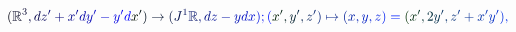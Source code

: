 \documentclass[12pt]{article}
\begin{document}
\makeatletter
\renewcommand*{\@textcolor}[3]{%
  \protect\leavevmode
  \begingroup
    \color#1{#2}#3%
  \endgroup
}
\makeatother
\begin{displaymath}
\mathcolor[RGB]{0,0,15}{(} \mathbb { \mathcolor[RGB]{0,0,30}{R} } ^ { \mathcolor[RGB]{0,0,45}{3} } \mathcolor[RGB]{0,0,60}{,} \mathcolor[RGB]{0,0,75}{d} \mathcolor[RGB]{0,0,90}{z} ^ { \mathcolor[RGB]{0,0,105}{\prime} } \mathcolor[RGB]{0,0,120}{+} \mathcolor[RGB]{0,0,135}{x} ^ { \mathcolor[RGB]{0,0,150}{\prime} } \mathcolor[RGB]{0,0,165}{d} \mathcolor[RGB]{0,0,180}{y} ^ { \mathcolor[RGB]{0,0,195}{\prime} } \mathcolor[RGB]{0,0,210}{-} \mathcolor[RGB]{0,0,225}{y} ^ { \mathcolor[RGB]{0,0,240}{\prime} } \mathcolor[RGB]{0,0,255}{d} \mathcolor[RGB]{0,15,0}{x} ^ { \mathcolor[RGB]{0,15,15}{\prime} } \mathcolor[RGB]{0,15,30}{)} \mathcolor[RGB]{0,15,45}{\to} \mathcolor[RGB]{0,15,60}{(} \mathcolor[RGB]{0,15,75}{J} ^ { \mathcolor[RGB]{0,15,90}{1} } \mathbb { \mathcolor[RGB]{0,15,105}{R} } \mathcolor[RGB]{0,15,120}{,} \mathcolor[RGB]{0,15,135}{d} \mathcolor[RGB]{0,15,150}{z} \mathcolor[RGB]{0,15,165}{-} \mathcolor[RGB]{0,15,180}{y} \mathcolor[RGB]{0,15,195}{d} \mathcolor[RGB]{0,15,210}{x} \mathcolor[RGB]{0,15,225}{)} \mathcolor[RGB]{0,15,240}{;} \mathcolor[RGB]{0,15,255}{(} \mathcolor[RGB]{0,30,0}{x} ^ { \mathcolor[RGB]{0,30,15}{\prime} } \mathcolor[RGB]{0,30,30}{,} \mathcolor[RGB]{0,30,45}{y} ^ { \mathcolor[RGB]{0,30,60}{\prime} } \mathcolor[RGB]{0,30,75}{,} \mathcolor[RGB]{0,30,90}{z} ^ { \mathcolor[RGB]{0,30,105}{\prime} } \mathcolor[RGB]{0,30,120}{)} \mathcolor[RGB]{0,30,135}{\mapsto} \mathcolor[RGB]{0,30,150}{(} \mathcolor[RGB]{0,30,165}{x} \mathcolor[RGB]{0,30,180}{,} \mathcolor[RGB]{0,30,195}{y} \mathcolor[RGB]{0,30,210}{,} \mathcolor[RGB]{0,30,225}{z} \mathcolor[RGB]{0,30,240}{)} \mathcolor[RGB]{0,30,255}{=} \mathcolor[RGB]{0,45,0}{(} \mathcolor[RGB]{0,45,15}{x} ^ { \mathcolor[RGB]{0,45,30}{\prime} } \mathcolor[RGB]{0,45,45}{,} \mathcolor[RGB]{0,45,60}{2} \mathcolor[RGB]{0,45,75}{y} ^ { \mathcolor[RGB]{0,45,90}{\prime} } \mathcolor[RGB]{0,45,105}{,} \mathcolor[RGB]{0,45,120}{z} ^ { \mathcolor[RGB]{0,45,135}{\prime} } \mathcolor[RGB]{0,45,150}{+} \mathcolor[RGB]{0,45,165}{x} ^ { \mathcolor[RGB]{0,45,180}{\prime} } \mathcolor[RGB]{0,45,195}{y} ^ { \mathcolor[RGB]{0,45,210}{\prime} } \mathcolor[RGB]{0,45,225}{)} \mathcolor[RGB]{0,45,240}{,}
\end{displaymath}
\end{document}
